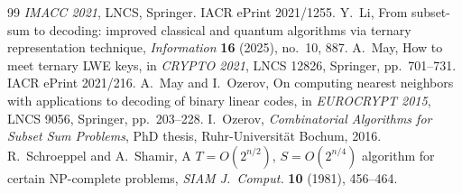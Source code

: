 \documentclass[11pt]{article}
\theoremstyle{definition}
\theoremstyle{remark}
\begin{document}
\begin{thebibliography}{99}
\emph{IMACC 2021}, LNCS, Springer. IACR ePrint 2021/1255.
 Y.~Li, From subset-sum to decoding: improved classical and quantum algorithms via ternary
representation technique, \emph{Information} \textbf{16} (2025), no.~10, 887.
 A.~May, How to meet ternary LWE keys, in \emph{CRYPTO 2021}, LNCS 12826, Springer, pp.~701--731.
IACR ePrint 2021/216.
 A.~May and I.~Ozerov, On computing nearest neighbors with applications to decoding of binary linear
codes, in \emph{EUROCRYPT 2015}, LNCS 9056, Springer, pp.~203--228.
 I.~Ozerov, \emph{Combinatorial Algorithms for Subset Sum Problems}, PhD thesis, Ruhr-Universit\"at
Bochum, 2016.
 R.~Schroeppel and A.~Shamir, A $T=O(2^{n/2})$, $S=O(2^{n/4})$ algorithm for certain NP-complete
problems, \emph{SIAM J.\ Comput.} \textbf{10} (1981), 456--464.
\end{thebibliography}
\end{document}
